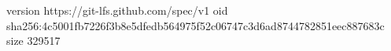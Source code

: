 version https://git-lfs.github.com/spec/v1
oid sha256:4c5001fb7226f3b8e5dfedb564975f52c06747c3d6ad8744782851eec887683c
size 329517
